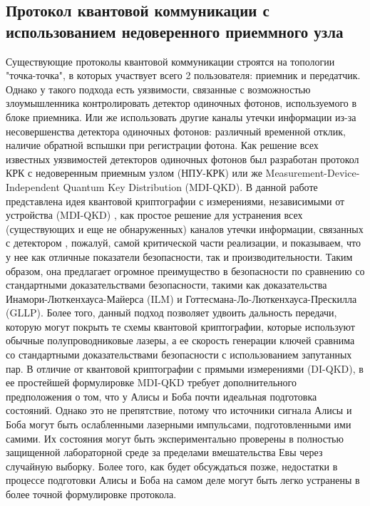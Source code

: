 \subsection{Протокол квантовой коммуникации с использованием недоверенного приеммного узла} \label{sec:ch1/sect2/MDI QKD}
Существующие протоколы квантовой коммуникации строятся на топологии "точка-точка", в которых участвует всего 2 пользователя: приемник и передатчик. Однако у такого подхода есть уязвимости, связанные  с возможностью злоумышленника контролировать детектор одиночных фотонов, используемого в блоке приемника. Или же использовать другие каналы утечки информации из-за несовершенства детектора одиночных фотонов: различный временной отклик, наличие обратной вспышки при регистрации фотона. Как решение всех известных уязвимостей детекторов одиночных фотонов был разработан протокол КРК с недоверенным приемным узлом (НПУ-КРК) или же Measurement-Device-Independent Quantum Key Distribution (MDI-QKD). 
\newline В данной работе представлена идея квантовой криптографии с измерениями, независимыми от устройства (MDI-QKD) \cite{lo2012,liu2013}, как простое решение для устранения всех (существующих и еще не обнаруженных) каналов утечки информации, связанных с детектором \cite{zhao2008}, пожалуй, самой критической части реализации, и показываем, что у нее как отличные показатели безопасности, так и производительности. Таким образом, она предлагает огромное преимущество в безопасности по сравнению со стандартными доказательствами безопасности, такими как доказательства Инамори-Люткенхауса-Майерса (ILM) \cite{inamori2007} и Готтесмана-Ло-Люткенхауса-Прескилла (GLLP). \cite{gottesman2004} Более того, данный подход позволяет удвоить дальность передачи, которую могут покрыть те схемы квантовой криптографии, которые используют обычные полупроводниковые лазеры, а ее скорость генерации ключей сравнима со стандартными доказательствами безопасности с использованием запутанных пар. В отличие от квантовой криптографии с прямыми измерениями (DI-QKD), в ее простейшей формулировке MDI-QKD требует дополнительного предположения о том, что у Алисы и Боба почти идеальная подготовка состояний. Однако это не препятствие, потому что источники сигнала Алисы и Боба могут быть ослабленными лазерными импульсами, подготовленными ими самими. Их состояния могут быть экспериментально проверены в полностью защищенной лабораторной среде за пределами вмешательства Евы через случайную выборку. Более того, как будет обсуждаться позже, недостатки в процессе подготовки Алисы и Боба на самом деле могут быть легко устранены в более точной формулировке протокола.
